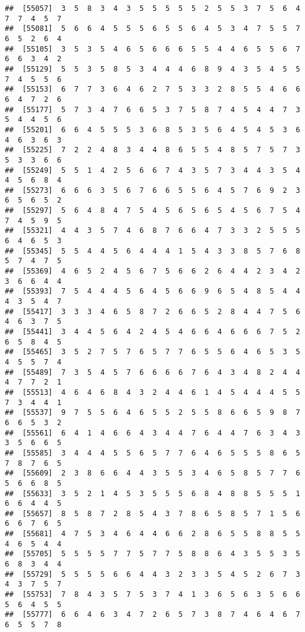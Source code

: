 \documentclass[
]{book}
\begin{document}
\begin{verbatim}
##  [55057]  3  5  8  3  4  3  5  5  5  5  5  2  5  5  3  7  5  6  4  7  7  4  5  7
##  [55081]  5  6  6  4  5  5  5  6  5  5  6  4  5  3  4  7  5  5  7  6  5  2  6  4
##  [55105]  3  5  3  5  4  6  5  6  6  6  5  5  4  4  6  5  5  6  7  6  6  3  4  2
##  [55129]  5  5  3  5  8  5  3  4  4  4  6  8  9  4  3  5  4  5  5  7  4  5  5  6
##  [55153]  6  7  7  3  6  4  6  2  7  5  3  3  2  8  5  5  4  6  6  6  4  7  2  6
##  [55177]  5  7  3  4  7  6  6  5  3  7  5  8  7  4  5  4  4  7  3  5  4  4  5  6
##  [55201]  6  6  4  5  5  5  3  6  8  5  3  5  6  4  5  4  5  3  6  4  6  3  6  3
##  [55225]  7  2  2  4  8  3  4  4  8  6  5  5  4  8  5  7  5  7  3  5  3  3  6  6
##  [55249]  5  5  1  4  2  5  6  6  7  4  3  5  7  3  4  4  3  5  4  4  5  6  8  4
##  [55273]  6  6  6  3  5  6  7  6  6  5  5  6  4  5  7  6  9  2  3  6  5  6  5  2
##  [55297]  5  6  4  8  4  7  5  4  5  6  5  6  5  4  5  6  7  5  4  7  4  5  9  5
##  [55321]  4  4  3  5  7  4  6  8  7  6  6  4  7  3  3  2  5  5  5  6  4  6  5  3
##  [55345]  5  5  4  4  5  6  4  4  4  1  5  4  3  3  8  5  7  6  8  5  7  4  7  5
##  [55369]  4  6  5  2  4  5  6  7  5  6  6  2  6  4  4  2  3  4  2  3  6  6  4  4
##  [55393]  7  5  4  4  4  5  6  4  5  6  6  9  6  5  4  8  5  4  4  4  3  5  4  7
##  [55417]  3  3  3  4  6  5  8  7  2  6  6  5  2  8  4  4  7  5  6  4  6  3  7  5
##  [55441]  3  4  4  5  6  4  2  4  5  4  6  6  4  6  6  6  7  5  2  6  5  8  4  5
##  [55465]  3  5  2  7  5  7  6  5  7  7  6  5  5  6  4  6  5  3  5  4  5  5  7  4
##  [55489]  7  3  5  4  5  7  6  6  6  6  7  6  4  3  4  8  2  4  4  4  7  7  2  1
##  [55513]  4  6  4  6  8  4  3  2  4  4  6  1  4  5  4  4  4  5  5  7  3  4  4  1
##  [55537]  9  7  5  5  6  4  6  5  5  2  5  5  8  6  6  5  9  8  7  6  6  5  3  2
##  [55561]  6  4  1  4  6  6  4  3  4  4  7  6  4  4  7  6  3  4  3  3  5  6  6  5
##  [55585]  3  4  4  4  5  5  6  5  7  7  6  4  6  5  5  5  8  6  5  7  8  7  6  5
##  [55609]  2  3  8  6  6  4  4  3  5  5  3  4  6  5  8  5  7  7  6  5  6  6  8  5
##  [55633]  3  5  2  1  4  5  3  5  5  5  6  8  4  8  8  5  5  5  1  6  6  4  4  5
##  [55657]  8  5  8  7  2  8  5  4  3  7  8  6  5  8  5  7  1  5  6  6  6  7  6  5
##  [55681]  4  7  5  3  4  6  4  4  6  6  2  8  6  5  5  8  8  5  5  4  6  5  4  4
##  [55705]  5  5  5  5  7  7  5  7  7  5  8  8  6  4  3  5  5  3  5  6  8  3  4  4
##  [55729]  5  5  5  5  6  6  4  4  3  2  3  3  5  4  5  2  6  7  3  4  3  7  5  7
##  [55753]  7  8  4  3  5  7  5  3  7  4  1  3  6  5  6  3  5  6  6  5  6  4  5  5
##  [55777]  6  6  4  6  3  4  7  2  6  5  7  3  8  7  4  6  4  6  7  6  5  5  7  8

\end{verbatim}
\end{document}
